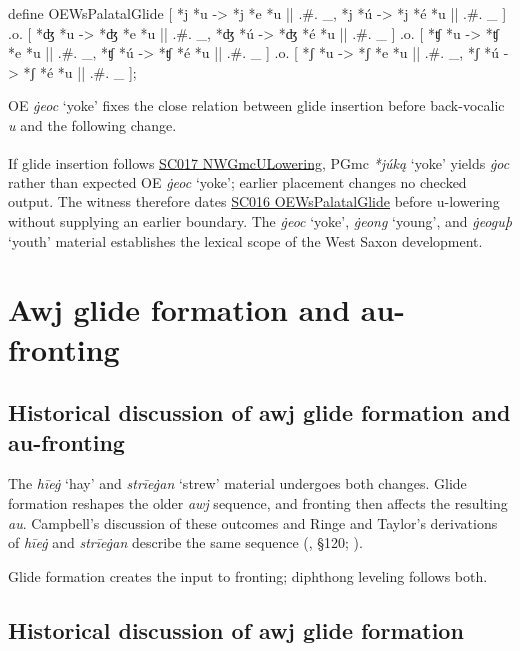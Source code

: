 \documentclass[
  british,
  a4paper,
  openany]{book}
\providecommand{\Pred}[1]{\textsuperscript{\dag}\emph{#1}}
\providecommand{\Recon}[1]{\emph{*#1}}
{\catcode`→=\active \global\def→{\ensuremath{\rightarrow}}}
\providecommand{\Pred}[1]{\textsuperscript{\dag}\emph{#1}}
\providecommand{\Recon}[1]{\emph{*#1}}
{\catcode`→=\active \global\def→{\ensuremath{\rightarrow}}}
\begin{document}
\begin{ReaderFacingFoma}
define OEWsPalatalGlide [
    {*j} {*u} -> {*j} {*e} {*u} || .#. _,
    {*j} {*ú} -> {*j} {*é} {*u} || .#. _
] .o. [
    {*ʤ} {*u} -> {*ʤ} {*e} {*u} || .#. _,
    {*ʤ} {*ú} -> {*ʤ} {*é} {*u} || .#. _
] .o. [
    {*ʧ} {*u} -> {*ʧ} {*e} {*u} || .#. _,
    {*ʧ} {*ú} -> {*ʧ} {*é} {*u} || .#. _
] .o. [
    {*ʃ} {*u} -> {*ʃ} {*e} {*u} || .#. _,
    {*ʃ} {*ú} -> {*ʃ} {*é} {*u} || .#. _
];
\end{ReaderFacingFoma}

OE \emph{ġeoc} `yoke' fixes the close relation between glide insertion
before back-vocalic \emph{u} and the following change.

If glide insertion follows \hyperref[rule-NWGmcULowering]{SC017
NWGmcULowering}, PGmc \Recon{júką} `yoke' yields \Pred{ġoc} rather than
expected OE \emph{ġeoc} `yoke'; earlier placement changes no checked
output. The witness therefore dates
\hyperref[rule-OEWsPalatalGlide]{SC016 OEWsPalatalGlide} before
u-lowering without supplying an earlier boundary. The \emph{ġeoc}
`yoke', \emph{ġeong} `young', and \emph{ġeoguþ} `youth' material
establishes the lexical scope of the West Saxon development.

\newpage

\section{Awj glide formation and
au-fronting}\label{awj-glide-formation-and-au-fronting}

\subsection{Historical discussion of awj glide formation and
au-fronting}\label{historical-discussion-of-awj-glide-formation-and-au-fronting}

The \emph{hīeġ} `hay' and \emph{strīeġan} `strew' material undergoes
both changes. Glide formation reshapes the older \emph{awj} sequence,
and fronting then affects the resulting \emph{au}. Campbell's discussion
of these outcomes and Ringe and Taylor's derivations of \emph{hīeġ} and
\emph{strīeġan} describe the same sequence
(, §120;
).

Glide formation creates the input to fronting; diphthong leveling
follows both.

\subsection{Historical discussion of awj glide
formation}\label{historical-discussion-of-awj-glide-formation}
\end{document}
